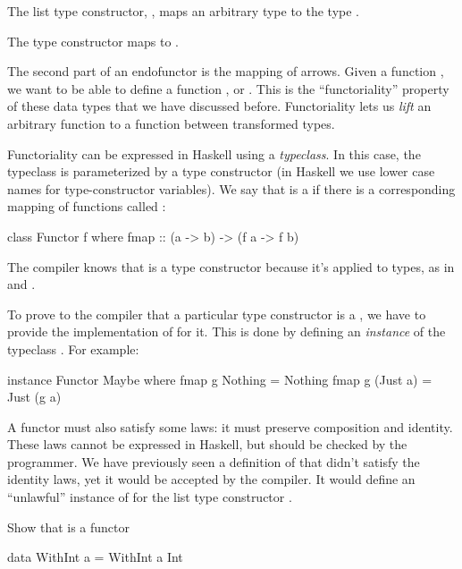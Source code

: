\documentclass[DaoFP]{subfiles}
\begin{document}
The list type constructor, , maps an arbitrary type  to the type .

The  type constructor maps  to .

The second part of an endofunctor is the mapping of arrows. Given a function , we want to be able to define a function , or . This is the ``functoriality'' property of these data types that we have discussed before. Functoriality lets us \emph{lift} an arbitrary function to a function between transformed types.

Functoriality can be expressed in Haskell using a \emph{typeclass}. In this case, the typeclass is parameterized by a type constructor  (in Haskell we use lower case names for type-constructor variables). We say that  is a  if there is a corresponding mapping of functions called :
\begin{haskell}
class Functor f where
  fmap :: (a -> b) -> (f a -> f b)
\end{haskell}
The compiler knows that  is a type constructor because it's applied to types, as in  and .

To prove to the compiler that a particular type constructor is a , we have to provide the implementation of  for it. This is done by defining an \emph{instance} of the typeclass . For example:
\begin{haskell}
instance Functor Maybe where
  fmap g Nothing  = Nothing
  fmap g (Just a) = Just (g a)
\end{haskell}

A functor must also satisfy some laws: it must preserve composition and identity. These laws cannot be expressed in Haskell, but should be checked by the programmer. We have previously seen a definition of  that didn't satisfy the identity laws, yet it would be accepted by the compiler. It would define an ``unlawful'' instance of  for the list type constructor \hask{[]}.

\begin{exercise}
Show that  is a functor
\begin{haskell}
data WithInt a = WithInt a Int
\end{haskell}
\end{exercise}
\end{document}
